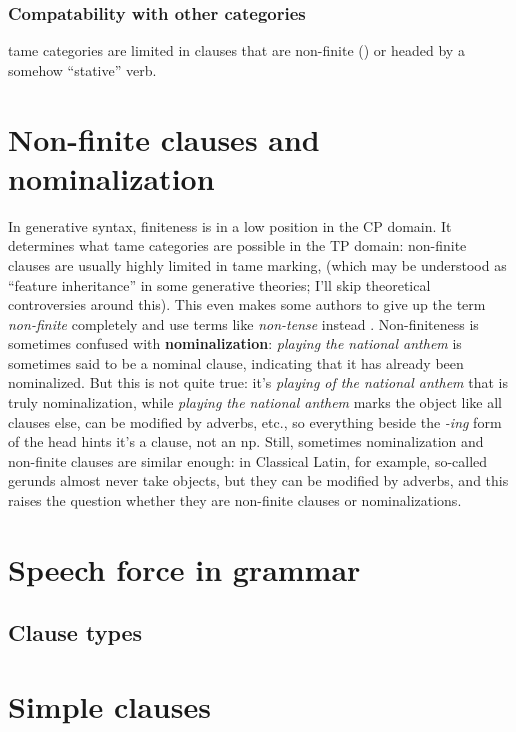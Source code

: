 \documentclass[UTF8, a4paper, oneside, scheme=plain]{ctexart}
\newcommand*{\citesec}[1]{\S~{#1}}
\newcommand*{\concept}[1]{\textbf{#1}}
\newcommand*{\term}[1]{\emph{#1}}
\newcommand*{\corpus}[1]{\emph{#1}}
\begin{document}
\subsubsection{Compatability with other categories}

\ac{tame} categories are limited in clauses 
that are non-finite ()
or headed by a somehow ``stative'' verb. %


\section{Non-finite clauses and nominalization}\label{sec:non-finite}

In generative syntax, finiteness is in a low position in the CP domain.
It determines what \ac{tame} categories are possible in the TP domain:
non-finite clauses are usually highly limited in \ac{tame} marking,
(which may be understood as ``feature inheritance'' in some generative theories; 
I'll skip theoretical controversies around this).
This even makes some authors to give up the term \term{non-finite} completely 
and use terms like \term{non-tense} instead \citep[\citesec{2.2.1}]{dixon2005semantic}.
Non-finiteness is sometimes confused with \concept{nominalization}:
\corpus{playing the national anthem} is sometimes said to be a nominal clause,
indicating that it has already been nominalized.
But this is not quite true:
it's \corpus{playing of the national anthem} that is truly nominalization,
while \corpus{playing the national anthem} marks the object like all clauses else,
can be modified by adverbs, etc.,
so everything beside the \corpus{-ing} form of the head hints it's a clause, not an \ac{np}.
Still, sometimes nominalization and non-finite clauses are similar enough:
in Classical Latin, for example,
so-called gerunds almost never take objects,
but they can be modified by adverbs,
and this raises the question whether they are non-finite clauses or nominalizations.

\section{Speech force in grammar}

\subsection{Clause types}

\section{Simple clauses}
\end{document}
